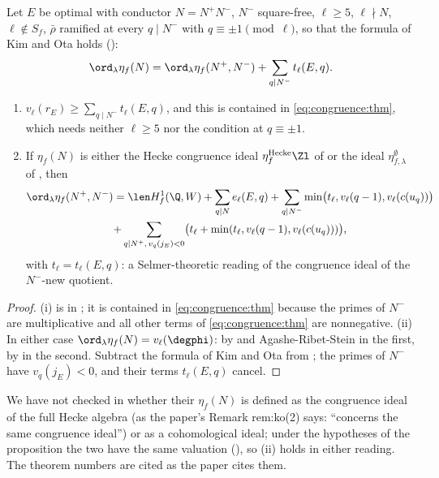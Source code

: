 \begin{proposition}\label{prop:congruence:kim-ota}
Let $E$ be optimal with conductor $N=N^+N^-$, $N^-$ square-free, $\ell\ge5$, $\ell\nmid N$, $\ell\notin S_f$, $\bar\rho$ ramified at every $q\mid N^-$ with $q\equiv\pm1\pmod\ell$, so that the formula of Kim and Ota
holds ():
\[
\ord_\lambda\eta_f(N)=\ord_\lambda\eta_f(N^+,N^-)+\sum_{q\mid N^-}t_\ell(E,q).
\]
\begin{enumerate}[label=(\roman*)]
\item $v_\ell(r_E)\ge\sum_{q\mid N^-}t_\ell(E,q)$, and this is contained in \eqref{eq:congruence:thm}, which needs neither $\ell\ge5$ nor the condition at $q\equiv\pm1$.
\item If $\eta_f(N)$ is either the Hecke congruence ideal $\eta^{\mathrm{Hecke}}_f\Zl$ of  or the ideal $\eta^\emptyset_{f,\lambda}$ of , then
\begin{multline*}
\ord_\lambda\eta_f(N^+,N^-)=\len H^1_f(\Q,W)+\sum_{q\mid N}e_\ell(E,q)+\sum_{q\mid N^-}\min\bigl(t_\ell,v_\ell(q-1),v_\ell(c(u_q))\bigr)\\
+\sum_{q\mid N^+,\,v_q(j_E)<0}\bigl(t_\ell+\min(t_\ell,v_\ell(q-1),v_\ell(c(u_q)))\bigr),
\end{multline*}
with $t_\ell=t_\ell(E,q)$: a Selmer-theoretic reading of the congruence ideal of the $N^-$-new quotient.
\end{enumerate}
\end{proposition}

\begin{proof}
(i) is in ; it is contained in \eqref{eq:congruence:thm} because the primes of $N^-$ are multiplicative and all other terms of \eqref{eq:congruence:thm} are nonnegative. (ii) In either case
$\ord_\lambda\eta_f(N)=v_\ell(\degphi)$: by  and Agashe-Ribet-Stein in the first, by  in the second. Subtract the formula of Kim and Ota from
; the primes of $N^-$ have $v_q(j_E)<0$, and their terms $t_\ell(E,q)$ cancel.
\end{proof}

\begin{remark}\label{rem:congruence:kim-ota-identification}
We have not checked in \cite{KimOta} whether their $\eta_f(N)$ is defined as the congruence ideal of the full Hecke algebra (as the paper's Remark rem:ko(2) says: ``concerns the same
congruence ideal'') or as a cohomological ideal; under the hypotheses of the proposition the two have the same valuation (), so (ii) holds in either reading.
The theorem numbers \cite[Theorem 1.3, Definition 1.15]{KimOta} are cited as the paper cites them.
\end{remark}


